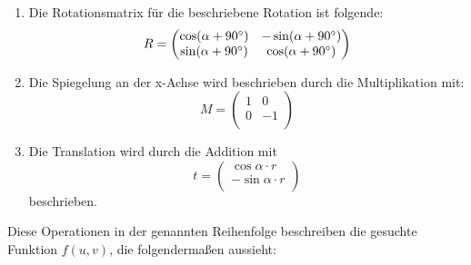 \documentclass[a4paper,10pt,DIV=14]{scrartcl}
\begin{document}
\newcommand{\rotangle}{\alpha + 90 \degree}
\begin{enumerate}[itemsep=0pt]
\item Die Rotationsmatrix für die beschriebene Rotation ist folgende:
\[
R = 
\begin{pmatrix}
\cos(\rotangle) & -\sin(\rotangle) \\
\sin(\rotangle) & \cos(\rotangle) \\
\end{pmatrix}
\]
\item Die Spiegelung an der x-Achse wird beschrieben durch die Multiplikation mit:
\[
M =
\begin{pmatrix}
1 & 0 \\
0 & -1 \\
\end{pmatrix}
\]

\item Die Translation wird durch die Addition mit 
\[
t= 
\begin{pmatrix}
\cos \alpha \cdot r \\
-\sin \alpha \cdot r \\
\end{pmatrix}
\]
beschrieben.
\end{enumerate}
Diese Operationen in der genannten Reihenfolge beschreiben die gesuchte Funktion $f(u,v)$, die folgendermaßen aussieht:
\end{document}
